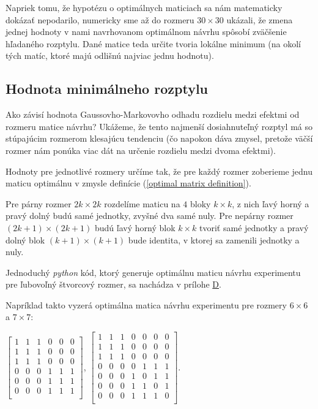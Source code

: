 Napriek tomu, že hypotézu o optimálnych maticiach sa nám matematicky dokázať nepodarilo, numericky sme až do rozmeru $30 \times 30$ ukázali,
že zmena jednej hodnoty v nami navrhovanom optimálnom návrhu spôsobí zväčšenie hľadaného rozptylu.
Dané matice teda určite tvoria lokálne minimum (na okolí tých matíc, ktoré majú odlišnú najviac jednu hodnotu).

\subsection{Hodnota minimálneho rozptylu}

Ako závisí hodnota Gaussovho-Markovovho odhadu rozdielu medzi efektmi od rozmeru matice návrhu? 
Ukážeme, že tento najmenší dosiahnuteľný rozptyl má so stúpajúcim rozmerom klesajúcu tendenciu
(čo napokon dáva zmysel, pretože väčší rozmer nám ponúka viac dát na určenie rozdielu medzi dvoma efektmi).

Hodnoty pre jednotlivé rozmery určíme tak, že pre každý rozmer zoberieme jednu maticu optimálnu 
v zmysle definície (\ref{optimal matrix definition}).

Pre párny rozmer $2k \times 2k$ rozdelíme maticu na $4$ bloky $k \times k$, 
z nich ľavý horný a pravý dolný budú samé jednotky, zvyšné dva samé nuly. 
Pre nepárny rozmer $(2k + 1) \times (2k + 1)$ budú ľavý horný blok $k \times k$ tvoriť samé jednotky 
a pravý dolný blok $(k + 1) \times (k + 1)$ bude identita, v ktorej sa zamenili jednotky a nuly.

Jednoduchý \emph{python} kód, ktorý generuje optimálnu maticu návrhu experimentu pre ľubovoľný štvorcový rozmer,
sa nachádza v prílohe \hyperref[appendix:d]{D}.

Napríklad takto vyzerá optimálna matica návrhu experimentu pre rozmery $6 \times 6$ a $7 \times 7$:

\begin{center}
$
\begin{bmatrix}
1 & 1 & 1 & 0 & 0 & 0 \\
1 & 1 & 1 & 0 & 0 & 0 \\
1 & 1 & 1 & 0 & 0 & 0 \\
0 & 0 & 0 & 1 & 1 & 1 \\
0 & 0 & 0 & 1 & 1 & 1 \\
0 & 0 & 0 & 1 & 1 & 1 \\
\end{bmatrix}
$,
$
\begin{bmatrix}
1 & 1 & 1 & 0 & 0 & 0 & 0 \\
1 & 1 & 1 & 0 & 0 & 0 & 0 \\
1 & 1 & 1 & 0 & 0 & 0 & 0 \\
0 & 0 & 0 & 0 & 1 & 1 & 1 \\
0 & 0 & 0 & 1 & 0 & 1 & 1 \\
0 & 0 & 0 & 1 & 1 & 0 & 1 \\
0 & 0 & 0 & 1 & 1 & 1 & 0 \\
\end{bmatrix}
$.
\end{center}

